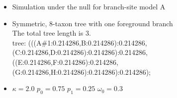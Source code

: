 \documentclass[12pt,letterpaper]{article}\usepackage[]{graphicx}\usepackage[]{color}
\newenvironment{knitrout}{}{} %
\begin{document}
\begin{itemize}
\item Simulation under the null for branch-site model A
\item Symmetric, 8-taxon tree with one foreground branch \\
  The total tree length is 3.\\
  tree: (((A\#1:0.214286,B:0.214286):0.214286,(C:0.214286,D:0.214286):0.214286):0.214286,\\((E:0.214286,F:0.214286):0.214286,(G:0.214286,H:0.214286):0.214286):0.214286);
\item $\kappa=2.0$ $p_0=0.75$ $p_{1}=0.25$ $\omega_0=0.3$
\end{itemize}

\begin{knitrout}
\color{fgcolor}


\end{knitrout}
\end{document}
